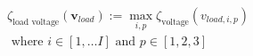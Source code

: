 \begin{equation}
\begin{split}
	\zeta_\text{load voltage}(\textbf{v}_{load}) := \max_{i,p}{\zeta_\text{voltage}(v_{load,i,p})} \\
	\text{ where } i \in [1, \dots I] \text{ and } p \in [1, 2, 3]
\end{split}
\label{ch1:equ:load-voltage-deviation}
\end{equation}